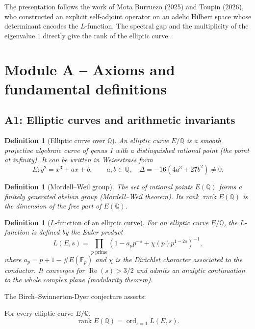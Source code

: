 \documentclass[11pt,a4paper]{article}
\newtheorem{definition}[theorem]{Definition}
\begin{document}
The presentation follows the work of Mota Burruezo (2025) and Toupin (2026), who constructed an explicit self‑adjoint operator on an adelic Hilbert space whose determinant encodes the \(L\)-function. The spectral gap and the multiplicity of the eigenvalue \(1\) directly give the rank of the elliptic curve.

\section{Module A – Axioms and fundamental definitions}

\subsection{A1: Elliptic curves and arithmetic invariants}

\begin{definition}[Elliptic curve over \(\mathbb{Q}\)]
An elliptic curve \(E/\mathbb{Q}\) is a smooth projective algebraic curve of genus 1 with a distinguished rational point (the point at infinity). It can be written in Weierstrass form
\[
E: y^2 = x^3 + ax + b,\qquad a,b\in\mathbb{Q},\quad \Delta = -16(4a^3+27b^2) \neq 0.
\]
\end{definition}

\begin{definition}[Mordell–Weil group]
The set of rational points \(E(\mathbb{Q})\) forms a finitely generated abelian group (Mordell–Weil theorem). Its rank \(\operatorname{rank} E(\mathbb{Q})\) is the dimension of the free part of \(E(\mathbb{Q})\).
\end{definition}

\begin{definition}[\(L\)-function of an elliptic curve]
For an elliptic curve \(E/\mathbb{Q}\), the \(L\)-function is defined by the Euler product
\[
L(E,s) = \prod_{p \text{ prime}} \left(1 - a_p p^{-s} + \chi(p) p^{1-2s}\right)^{-1},
\]
where \(a_p = p+1 - \#E(\mathbb{F}_p)\) and \(\chi\) is the Dirichlet character associated to the conductor. It converges for \(\operatorname{Re}(s) > 3/2\) and admits an analytic continuation to the whole complex plane (modularity theorem).
\end{definition}

The Birch–Swinnerton-Dyer conjecture asserts:

\begin{conjecture}[BSD]
For every elliptic curve \(E/\mathbb{Q}\),
\[
\operatorname{rank} E(\mathbb{Q}) = \operatorname{ord}_{s=1} L(E,s).
\]
\end{conjecture}
\end{document}
